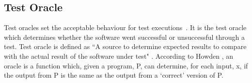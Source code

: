 



\subsection{Test Oracle}
Test oracles set the acceptable behaviour for test executions~\cite{baresi2001test}. It is the test oracle which determines whether the software went successful or unsuccessful through a test. Test oracle is defined as ``A source to determine expected results to compare with the actual result of the software under test" \cite{ahmed2010software}. According to Howden \cite{howden1986}, an oracle is a function which, given a program, P, can determine, for each input, x, if the output from P is the same as the output from a ‘correct’ version of P.

